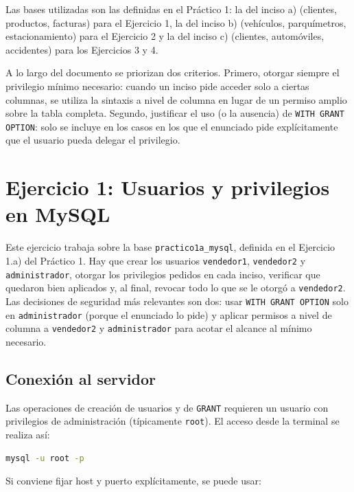 \documentclass[11pt,a4paper]{article}
\begin{document}
Las bases utilizadas son las definidas en el Práctico 1: la del inciso a) (clientes, productos, facturas) para el Ejercicio 1, la del inciso b) (vehículos, parquímetros, estacionamiento) para el Ejercicio 2 y la del inciso c) (clientes, automóviles, accidentes) para los Ejercicios 3 y 4.

A lo largo del documento se priorizan dos criterios. Primero, otorgar siempre el privilegio mínimo necesario: cuando un inciso pide acceder solo a ciertas columnas, se utiliza la sintaxis a nivel de columna en lugar de un permiso amplio sobre la tabla completa. Segundo, justificar el uso (o la ausencia) de \texttt{WITH GRANT OPTION}: solo se incluye en los casos en los que el enunciado pide explícitamente que el usuario pueda delegar el privilegio.

\section{Ejercicio 1: Usuarios y privilegios en MySQL}

Este ejercicio trabaja sobre la base \texttt{practico1a\_mysql}, definida en el Ejercicio 1.a) del Práctico 1. Hay que crear los usuarios \texttt{vendedor1}, \texttt{vendedor2} y \texttt{administrador}, otorgar los privilegios pedidos en cada inciso, verificar que quedaron bien aplicados y, al final, revocar todo lo que se le otorgó a \texttt{vendedor2}. Las decisiones de seguridad más relevantes son dos: usar \texttt{WITH GRANT OPTION} solo en \texttt{administrador} (porque el enunciado lo pide) y aplicar permisos a nivel de columna a \texttt{vendedor2} y \texttt{administrador} para acotar el alcance al mínimo necesario.

\subsection{Conexión al servidor}

Las operaciones de creación de usuarios y de \texttt{GRANT} requieren un usuario con privilegios de administración (típicamente \texttt{root}). El acceso desde la terminal se realiza así:

\begin{lstlisting}[language=bash]
mysql -u root -p
\end{lstlisting}

Si conviene fijar host y puerto explícitamente, se puede usar:
\end{document}
